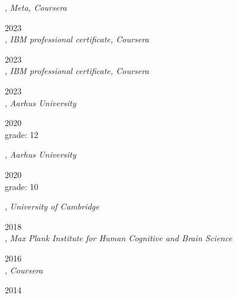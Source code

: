 

,
\textit{Meta, Coursera}\strut \hfill 2023\\

,
\textit{IBM professional certificate, Coursera}\strut \hfill 2023\\

,
\textit{IBM professional certificate, Coursera}\strut \hfill 2023\\

,
\textit{Aarhus University}\strut \hfill 2020\\
grade: 12

,
\textit{Aarhus University}\strut \hfill 2020\\
grade: 10

,
\textit{University of Cambridge}\strut \hfill 2018\\

,
\textit{Max Plank Institute for Human Cognitive and Brain Science}\strut \hfill 2016\\

,
\textit{Coursera}\strut \hfill 2014\\

